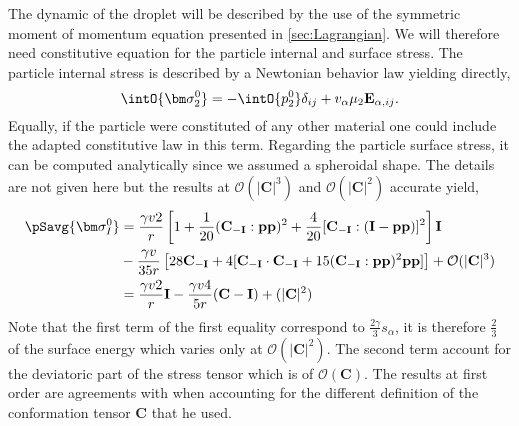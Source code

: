 The dynamic of the droplet will be described by the use of the symmetric moment of momentum equation presented in \ref{sec:Lagrangian}.
We will therefore need constitutive equation for the particle internal and surface stress. 
The particle internal stress is described by a Newtonian behavior law yielding directly, 
\begin{equation*}
    \intO{\bm\sigma_2^0}
    = - \intO{p_2^0} \delta_{ij}
    + v_\alpha \mu_2 \textbf{E}_{\alpha,ij}.
\end{equation*} 
Equally, if the particle were constituted of any other material one could include the adapted constitutive law in this term. 
Regarding the particle surface stress, it can be computed analytically since we assumed a spheroidal shape. 
The details are not given here but the results at $\mathcal{O}(|\textbf{C}|^3)$  and $\mathcal{O}(|\textbf{C}|^2)$ accurate yield, 
\begin{align*}
    \pSavg{\bm\sigma_I^0}
    &= \frac{\gamma v 2}{r} \left[
        1  + \frac{1}{20 } (\textbf{C}_{-\textbf{I}}:\textbf{pp})^2 
        + \frac{4}{20 } [\textbf{C}_{-\textbf{I}}:(\textbf{I}-\textbf{pp})]^2\right] \textbf{I}\\
        &- \frac{\gamma v}{35 r} \left[ 28 \textbf{C}_{-\textbf{I}}
        + 4[\textbf{C}_{-\textbf{I}}\cdot \textbf{C}_{-\textbf{I}} + 15 (\textbf{C}_{-\textbf{I}}:\textbf{pp})^2\textbf{pp}]
        \right]
        +\mathcal{O}(|\textbf{C}|^3)\\
    &= \frac{\gamma v 2}{r} \textbf{I} - \frac{\gamma v 4}{5 r} (\textbf{C} - \textbf{I})
    +\mathcal(|\textbf{C}|^2)
\end{align*}
Note that the first term of the first equality correspond to $\frac{2\gamma}{3}s_\alpha$, it is therefore $\frac{2}{3}$ of the surface energy which varies only at $\mathcal{O}(|\textbf{C}|^2)$. 
The second term account for the deviatoric part of the stress tensor which is of $\mathcal{O}(\textbf{C})$. 
The results at first order are agreements with \citet{lhuillier1987phenomenology} when accounting for the different definition of the conformation tensor \textbf{C} that he used.

